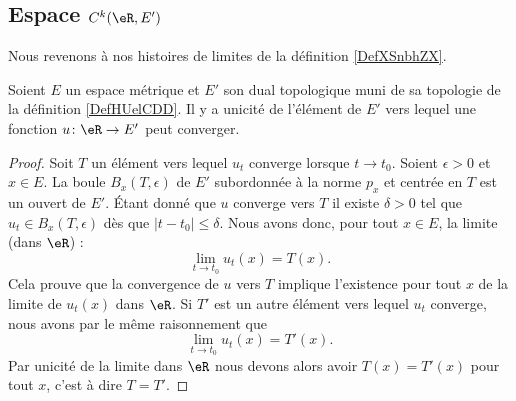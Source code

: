 \subsection{Espace \texorpdfstring{$ C^k(\eR,E')$}{C(R,E')}}

Nous revenons à nos histoires de limites de la définition \ref{DefXSnbhZX}.
\begin{proposition} \label{PropRBCiHbz}
    Soient \( E\) un espace métrique et \( E'\) son dual topologique muni de sa topologie de la définition \ref{DefHUelCDD}. Il y a unicité de l'élément de \( E'\) vers lequel une fonction \( u\colon \eR\to E' \) peut converger.
\end{proposition}

\begin{proof}
    Soit \( T\) un élément vers lequel \( u_t\) converge lorsque \( t\to t_0\). Soient \( \epsilon>0\) et \( x\in E\). La boule \( B_x(T,\epsilon)\) de \( E'\) subordonnée à la norme \( p_x\) et centrée en \( T\) est un ouvert de \( E'\). Étant donné que \( u\) converge vers \( T\) il existe \( \delta>0\) tel que \( u_t\in B_x(T,\epsilon)\) dès que \( | t-t_0 |\leq \delta\). Nous avons donc, pour tout \( x\in E\), la limite (dans \( \eR\)) :
    \begin{equation}
        \lim_{t\to t_0} u_t(x)=T(x).
    \end{equation}
    Cela prouve que la convergence de \( u\) vers \( T\) implique l'existence pour tout \( x\) de la limite de \( u_t(x)\) dans \( \eR\). Si \( T'\) est un autre élément vers lequel \( u_t\) converge, nous avons par le même raisonnement que
    \begin{equation}
        \lim_{t\to t_0} u_t(x)=T'(x).
    \end{equation}
    Par unicité de la limite dans \( \eR\)
    nous devons alors avoir \( T(x)=T'(x)\) pour tout \( x\), c'est à dire \( T=T'\).
\end{proof}

